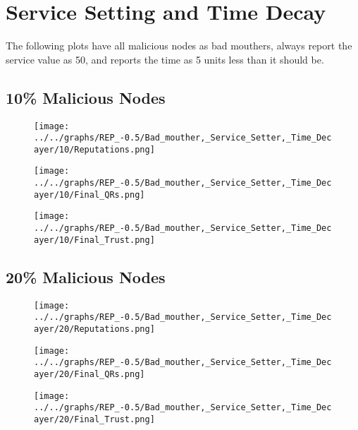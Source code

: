 \section*{Service Setting and Time Decay}
The following plots have all malicious nodes as bad mouthers, always
report the service value as 50, and reports the time as 5 units less than
it should be.
\\
\begin{minipage}[t]{0.49\columnwidth}
\subsection*{10\% Malicious Nodes}
    \begin{figure}[H]
        \centering
        \texttt{[image: ../../graphs/REP\_-0.5/Bad\_mouther,\_Service\_Setter,\_Time\_Decayer/10/Reputations.png]}
    \end{figure}
    \begin{figure}[H]
        \centering
        \texttt{[image: ../../graphs/REP\_-0.5/Bad\_mouther,\_Service\_Setter,\_Time\_Decayer/10/Final\_QRs.png]}
    \end{figure}
\end{minipage}
\begin{minipage}[t]{0.49\columnwidth}
    \begin{figure}[H]
        \centering
        \texttt{[image: ../../graphs/REP\_-0.5/Bad\_mouther,\_Service\_Setter,\_Time\_Decayer/10/Final\_Trust.png]}
    \end{figure}
\end{minipage}

\begin{minipage}[t]{0.49\columnwidth}
\subsection*{20\% Malicious Nodes}
    \begin{figure}[H]
        \centering
        \texttt{[image: ../../graphs/REP\_-0.5/Bad\_mouther,\_Service\_Setter,\_Time\_Decayer/20/Reputations.png]}
    \end{figure}
    \begin{figure}[H]
        \centering
        \texttt{[image: ../../graphs/REP\_-0.5/Bad\_mouther,\_Service\_Setter,\_Time\_Decayer/20/Final\_QRs.png]}
    \end{figure}
\end{minipage}
\begin{minipage}[t]{0.49\columnwidth}
    \begin{figure}[H]
        \centering
        \texttt{[image: ../../graphs/REP\_-0.5/Bad\_mouther,\_Service\_Setter,\_Time\_Decayer/20/Final\_Trust.png]}
    \end{figure}
\end{minipage}

